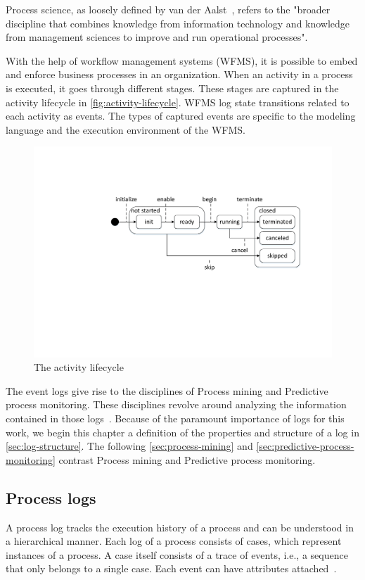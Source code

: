 Process science, as loosely defined by van der Aalst~\cite{Aalst2016}, refers to the "broader discipline that combines knowledge from information technology and knowledge from management sciences to improve and run operational processes".

With the help of workflow management systems (WFMS), it is possible to embed and enforce business processes in an organization. When an activity in a process is executed, it goes through different stages. These stages are captured in the activity lifecycle in \autoref{fig:activity-lifecycle}. WFMS log state transitions related to each activity as events. The types of captured events are specific to the modeling language and the execution environment of the WFMS.

\begin{figure}[!htb]
    \centering
    \includegraphics[width=.9\textwidth]{gfx/activityLifeCycle.pdf}
    \caption{The activity lifecycle}
    \label{fig:activity-lifecycle}
\end{figure}

The event logs give rise to the disciplines of Process mining and Predictive process monitoring. These disciplines revolve around analyzing the information contained in those logs~\cite{Aalst2016}. Because of the paramount importance of logs for this work, we begin this chapter a definition of the properties and structure of a log in \autoref{sec:log-structure}. The following \autoref{sec:process-mining} and \autoref{sec:predictive-process-monitoring} contrast Process mining and Predictive process monitoring.

\subsection{Process logs}\label{sec:log-structure}
A process log tracks the execution history of a process and can be understood in a hierarchical manner. Each log of a process consists of cases, which represent instances of a process. A case itself consists of a trace of events, i.e., a sequence that only belongs to a single case. Each event can have attributes attached~\cite{Aalst2016}.

